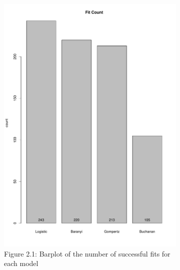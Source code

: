 \documentclass[11pt]{article}
\begin{document}
\begin{figure}[h!]
    \centering
    \begin{subfigure}[h]{0.4\textwidth}
        \includegraphics[width=\textwidth]{../Results/Fit_count.pdf}
        \caption{Figure 2.1: Barplot of the number of successful fits for each model}
        \label{fig:Fit Count}
    \end{subfigure}
    \hfill
    \begin{subfigure}[h]{0.4\textwidth}

\end{subfigure}
\end{figure}
\end{document}
